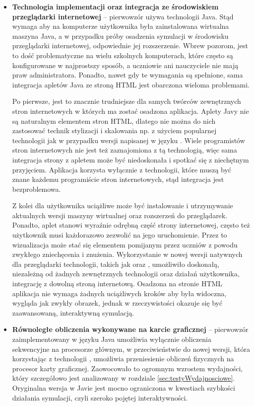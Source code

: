 \begin{itemize}

\item \textbf{Technologia implementacji oraz integracja ze środowiskiem
przeglądarki internetowej} -- pierwowzór używa technologii Java. Stąd wymaga aby
na komputerze użytkownika była zainstalowana wirtualna maszyna Java, a w
przypadku próby osadzenia symulacji w środowisku przeglądarki internetowej,
odpowiednie jej rozszerzenie. Wbrew pozorom, jest to dość problematyczne na
wielu szkolnych komputerach, które często są konfigurowane w najprostszy sposób,
a uczniowie ani nauczyciele nie mają praw administratora. Ponadto, nawet gdy te
wymagania są spełnione, sama integracja apletów Java ze stroną HTML jest
obarczona wieloma problemami.

Po pierwsze, jest to znacznie trudniejsze dla samych twórców zewnętrznych stron
internetowych w których ma zostać osadzona aplikacja. Aplety Javy nie są
naturalnym elementem stron HTML, dlatego nie można do nich zastosować technik
stylizacji i skalowania np. z użyciem popularnej technologii  jak w
przypadku wersji \en napisanej w języku \js. Wiele programistów stron
internetowych nie jest też zaznajomiona z tą technologią, więc sama integracja
strony z apletem może być niedoskonała i spotkać się z niechętnym przyjęciem.
Aplikacja \en \js korzysta wyłącznie z technologii, które muszą być znane
każdemu programiście stron internetowych, stąd integracja jest bezproblemowa.

Z kolei dla użytkownika uciążliwe może być instalowanie i utrzymywanie
aktualnych wersji maszyny wirtualnej oraz rozszerzeń do przeglądarek. Ponadto,
aplet stanowi wyraźnie odrębną część strony internetowej, często też użytkownik
musi każdorazowo zezwolić na jego uruchomienie. Przez to wizualizacja może stać
się elementem pomijanym przez uczniów z powodu zwykłego zniechęcenia i znużenia.
Wykorzystanie w nowej wersji natywnych dla przeglądarki technologii, takich jak
\js oraz , umożliwiło doskonałą, niezależną od żadnych zewnętrznych
technologii oraz działań użytkownika, integrację z dowolną stroną internetową.
Osadzona na stronie HTML aplikacja nie wymaga żadnych uciążliwych kroków aby
była widoczna, wygląda jak zwykły obrazek, jednak w rzeczywistości okazuje się
być zaawansowaną, interaktywną symulacją.

\item \textbf{Równoległe obliczenia wykonywane na karcie graficznej} --
pierwowzór zaimplementowany w języku Java umożliwia wyłącznie obliczenia
sekwencyjne na procesorze głównym, w przeciwieństwie do nowej wersji, która
korzystając z technologii , umożliwia przeniesienie obliczeń
fizycznych na procesor karty graficznej. Zaowocowało to ogromnym wzrostem
wydajności, który szczegółowo jest analizowany w rozdziale
\ref{sec:testyWydajnosciowe}. Oryginalna wersja w Javie jest mocno ograniczona w
kwestiach szybkości działania symulacji, czyli szeroko pojętej interaktywności.


\end{itemize}
